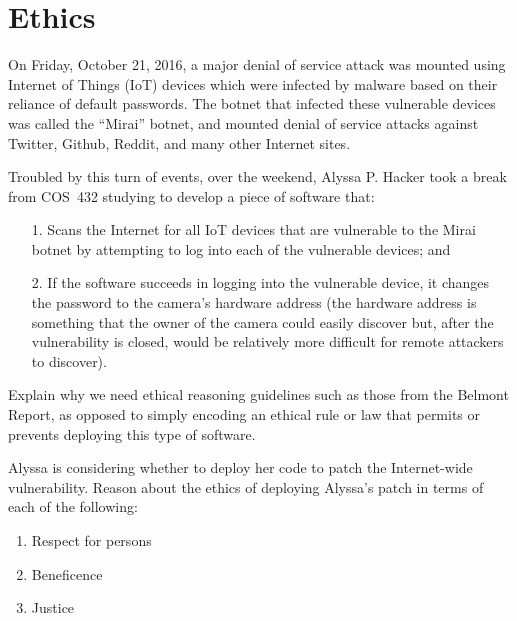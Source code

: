 \section{Ethics}

On Friday, October 21, 2016, a major denial of service attack was
mounted using Internet of Things (IoT) devices which were infected by
malware based on their reliance of default passwords. The botnet that
infected these vulnerable devices was called the ``Mirai'' botnet, and
mounted denial of service attacks against Twitter, Github, Reddit, and
many other Internet sites.

Troubled by this turn of events, over the weekend, Alyssa P. Hacker took a break from
COS~432 studying to develop a 
piece of software that:
\begin{enumerate}
\item[1.] Scans the Internet for all IoT devices that are vulnerable to the
  Mirai botnet by attempting to log into each of the vulnerable devices; and
\item[2.] If the software succeeds in logging into the vulnerable device, it
  changes the password to the camera's hardware address (the hardware
  address is something that the owner of the camera could easily
  discover but, after the vulnerability is closed, would be relatively
  more difficult for remote attackers to discover).
\end{enumerate}

 Explain why we need ethical reasoning guidelines such as those
from the Belmont Report, as opposed to simply encoding an ethical rule
or law that permits or prevents deploying this type of software.
\eprob


\newpage
{} Alyssa is considering whether to deploy her code to patch the
Internet-wide vulnerability.  Reason about the ethics of deploying Alyssa's
patch in terms of each of the following:
\begin{enumerate}
\item Respect for persons
\item Beneficence
\item Justice
\end{enumerate}
\eprob

